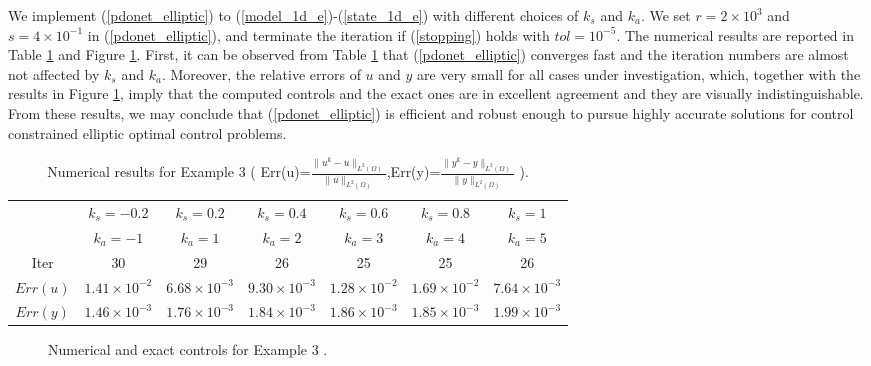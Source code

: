 \documentclass[final]{siamart171218}
\theoremstyle{remark}
\begin{document}
We implement (\ref{pdonet_elliptic}) to (\ref{model_1d_e})-(\ref{state_1d_e}) with different choices of $k_s$ and $k_a$. We set $r=2\times 10^3$ and $s=4\times 10^{-1}$ in (\ref{pdonet_elliptic}), and terminate the iteration if (\ref{stopping}) holds with $tol=10^{-5}$. The numerical results are reported in Table \ref{tab:iter_ex3} and  Figure \ref{fig:result_ol_ell}. First, it can be observed from Table \ref{tab:iter_ex3} that   (\ref{pdonet_elliptic}) converges fast and the iteration numbers are almost not affected by $k_s$ and $k_a$. Moreover,  the relative errors of $u$ and $y$ are very small for all cases under investigation, which, together with the results in Figure \ref{fig:result_ol_ell}, imply that the computed controls and the exact ones are in excellent agreement and they are visually indistinguishable.  From these results, we may conclude  that (\ref{pdonet_elliptic}) is efficient and robust enough to pursue highly accurate solutions for control constrained elliptic optimal control problems.

\begin{table}[htpb]
	\centering
	\caption{Numerical results for Example 3 ( Err(u)=$\frac{\|u^k-u\|_ {L^2(\Omega)} }{\|u\|_{L^2(\Omega)}}$,Err(y)=$\frac{\|y^k-y\|_{L^2(\Omega)}}{\|y\|_{L^2(\Omega)}}$ ).}\label{tab:iter_ex3}
	{\footnotesize\begin{tabular}{|c|c|c|c|c|c|c|}
			\hline
			&$k_s=-0.2$&$k_s=0.2$&$k_s=0.4$&$k_s=0.6$&$k_s=0.8$&$k_s=1$\\
			&$k_a=-1$&$k_a=1$&$k_a=2$&$k_a=3$&$k_a=4$&$k_a=5$\\
			\hline
			Iter&30 &29& 26& 25& 25& 26\\
			\hline
			$Err(u)$&$1.41\times 10^{-2}$& $6.68\times 10^{-3}$&$9.30\times 10^{-3}$ &$1.28\times 10^{-2}$ & $1.69\times 10^{-2}$& $7.64\times 10^{-3}$\\
			\hline
		    $Err(y)$&$1.46\times 10^{-3}$ &$1.76\times 10^{-3}$&$1.84\times 10^{-3}$& $1.86\times 10^{-3}$&$1.85\times 10^{-3}$ &$1.99\times 10^{-3}$ \\
			\hline
		\end{tabular}
	}
\end{table}


\begin{figure}[htpb]
	\caption{ Numerical and exact controls for Example 3 .}\label{fig:result_ol_ell}
	\centering
\end{figure}
\end{document}
